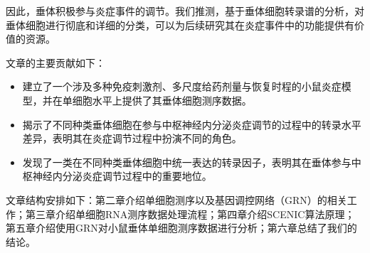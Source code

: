   因此，垂体积极参与炎症事件的调节。我们推测，基于垂体细胞转录谱的分析，对垂体细胞进行彻底和详细的分类，可以为后续研究其在炎症事件中的功能提供有价值的资源。

  文章的主要贡献如下：
\begin{itemize}
    \item 建立了一个涉及多种免疫刺激剂、多尺度给药剂量与恢复时程的小鼠炎症模型，并在单细胞水平上提供了其垂体细胞测序数据。
    \item 揭示了不同种类垂体细胞在参与中枢神经内分泌炎症调节的过程中的转录水平差异，表明其在炎症调节过程中扮演不同的角色。
    \item 发现了一类在不同种类垂体细胞中统一表达的转录因子，表明其在垂体参与中枢神经内分泌炎症调节过程中的重要地位。
\end{itemize}

  文章结构安排如下：第二章介绍单细胞测序以及基因调控网络（GRN）的相关工作；第三章介绍单细胞RNA测序数据处理流程；第四章介绍SCENIC算法原理；第五章介绍使用GRN对小鼠垂体单细胞测序数据进行分析；第六章总结了我们的结论。

